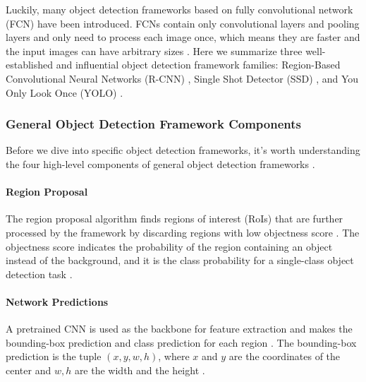 \documentclass[a4paper, 11pt, oneside]{article}
\begin{document}
  Luckily, many object detection frameworks based on fully convolutional network (FCN) \cite{long2015fully} have been
  introduced. FCNs contain only convolutional layers and pooling layers and only need to process each image once, which
  means they are faster and the input images can have arbitrary sizes \cite{elgendy2020deep, geron2019hands, long2015fully}.
  Here we summarize three well-established and influential object detection framework families: Region-Based Convolutional
  Neural Networks (R-CNN) \cite{girshick2014rich, girshick2015fast, ren2015faster}, Single Shot Detector (SSD)
  \cite{liu2016ssd}, and You Only Look Once (YOLO)
  \cite{redmon2016you, redmon2017yolo9000, redmon2018yolov3, bochkovskiy2020yolov4, yolov5}.

  \subsubsection{General Object Detection Framework Components}

  \label{sec:generalobjectdetection}

  Before we dive into specific object detection frameworks, it's worth understanding the four high-level components of
  general object detection frameworks \cite{elgendy2020deep}.

  \paragraph{Region Proposal}

  The region proposal algorithm finds regions of interest (RoIs) that are further processed by the framework by
  discarding regions with low objectness score \cite{elgendy2020deep}. The objectness score indicates the probability of
  the region containing an object instead of the background, and it is the class probability for a single-class object
  detection task \cite{elgendy2020deep}.

  \paragraph{Network Predictions}

  A pretrained CNN is used as the backbone for feature extraction and makes the bounding-box prediction and class prediction
  for each region \cite{elgendy2020deep}. The bounding-box prediction is the tuple $(x, y, w, h)$, where $x$ and $y$ are
  the coordinates of the center and $w, h$ are the width and the height \cite{elgendy2020deep}.
\end{document}
